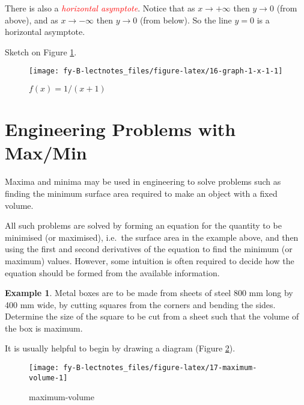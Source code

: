 \documentclass[
  11pt,
  oneside]{book}
\newcommand{\slide}{}
\theoremstyle{definition}
\theoremstyle{definition}
\newtheorem{example}{Example}[chapter]
\theoremstyle{definition}
\theoremstyle{definition}
\theoremstyle{remark}
\begin{document}
There is also a \textcolor{red}{\em horizontal asymptote}. Notice that as \(x\to+\infty\) then \(y\to 0\) (from above), and as \(x\to-\infty\) then \(y\to0\) (from below). So the line \(y=0\) is a horizontal asymptote.

Sketch on Figure \ref{fig:16-graph-1-x-1}.

\begin{figure}

{\centering \texttt{[image: fy-B-lectnotes\_files/figure-latex/16-graph-1-x-1-1]} 

}

\caption{$f(x)=1/(x+1)$}\label{fig:16-graph-1-x-1}
\end{figure}

\slide

\section{Engineering Problems with Max/Min}\label{engineering-problems-with-maxmin}

Maxima and minima may be used in engineering to solve problems such as finding the minimum surface area required to make an object with a fixed volume.

All such problems are solved by forming an equation for the quantity to be minimised (or maximised), i.e.~the surface area in the example above, and then using the first and second derivatives of the equation to find the minimum (or maximum) values. However, some intuition is often required to decide how the equation should be formed from the available information.

\begin{example}
Metal boxes are to be made from sheets of steel 800 mm long by 400 mm wide, by cutting squares from the corners and bending the sides. Determine the size of the square to be cut from a sheet such that the volume of the box is maximum.
\end{example}

It is usually helpful to begin by drawing a diagram (Figure \ref{fig:17-maximum-volume}).

\begin{figure}

{\centering \texttt{[image: fy-B-lectnotes\_files/figure-latex/17-maximum-volume-1]} 

}

\caption{maximum-volume}\label{fig:17-maximum-volume}
\end{figure}
\end{document}
